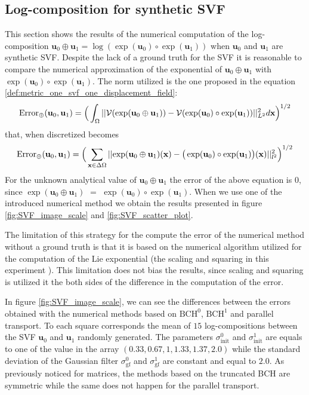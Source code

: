 \subsection{Log-composition for synthetic SVF}
This section shows the results of the numerical computation of the log-composition $\mathbf{u}_0\oplus\mathbf{u}_1 = \log(\exp(\mathbf{u}_0)\circ \exp(\mathbf{u}_1))$ when $\mathbf{u}_0$ and $\mathbf{u}_1$ are synthetic SVF. Despite the lack of a ground truth for the SVF it is reasonable to compare the numerical approximation of the exponential of $\mathbf{u}_0\oplus\mathbf{u}_1$ with $\exp(\mathbf{u}_0)\circ \exp(\mathbf{u}_1)$. The norm utilized is the one proposed in the equation \ref{def:metric_one_svf_one_displacement_field}:
\begin{align}
\text{Error}_{\oplus}(\mathbf{u}_0, \mathbf{u}_1)
= 
\Big(\int_{\Omega} \vert\lvert \mathcal{V}(\exp(\mathbf{u}_0\oplus\mathbf{u}_1)) - \mathcal{V}(\exp(\mathbf{u}_0)\circ \exp(\mathbf{u}_1)) \rvert\vert_{L^2}^{2} d\mathbf{x} \Big)^{1/2}
\end{align} 
that, when discretized becomes
\begin{align}\label{eq:error_svf_sythetic_data}
\text{Error}_{\oplus}(\mathbf{u}_0, \mathbf{u}_1) 
= 
\Big( \sum_{\mathbf{x} \in \Delta\Omega} 
\vert\lvert \exp(\mathbf{u}_0\oplus\mathbf{u}_1)(\mathbf{x}) 
	-
\big(\exp(\mathbf{u}_0)\circ \exp(\mathbf{u}_1)\big)(\mathbf{x}) 
	   \rvert\vert_{l^2}^{2}  \Big)^{1/2}
\end{align} 
For the unknown analytical value of $\mathbf{u}_0\oplus\mathbf{u}_1$ the error of the above equation is $0$, since $\exp(\mathbf{u}_0\oplus\mathbf{u}_1)$ $=$
$\exp(\mathbf{u}_0)\circ \exp(\mathbf{u}_1)$. When we use one of the introduced numerical method we obtain the results presented in figure \ref{fig:SVF_image_scale} and \ref{fig:SVF_scatter_plot}. 

The limitation of this strategy for the compute the error of the numerical method without a ground truth is that it is based on the numerical algorithm utilized for the computation of the Lie exponential (the scaling and squaring in this experiment \cite{arsigny2006log}). This limitation does not bias the results, since scaling and squaring is utilized it the both sides of the difference in the computation of the error.

In figure \ref{fig:SVF_image_scale}, we can see the differences between the errors obtained with the numerical methods based on $\text{BCH}^0$, $\text{BCH}^1$ and parallel transport. To each square corresponds the mean of $15$ log-compositions between the SVF $\mathbf{u}_0$ and $\mathbf{u}_1$ randomly generated. The parameters $\sigma_{\text{init}}^{0}$ and $\sigma_{\text{init}}^{1}$ are equals to one of the value in the array $(0.33, 0.67, 1, 1.33, 1.37, 2.0)$ while the standard deviation of the Gaussian filter $\sigma_{\text{gf}}^{0}$ and $\sigma_{\text{gf}}^{1}$ are constant and equal to $2.0$. As previously noticed for matrices, the methods based on the truncated  BCH are symmetric while the same does not happen for the parallel transport. 

